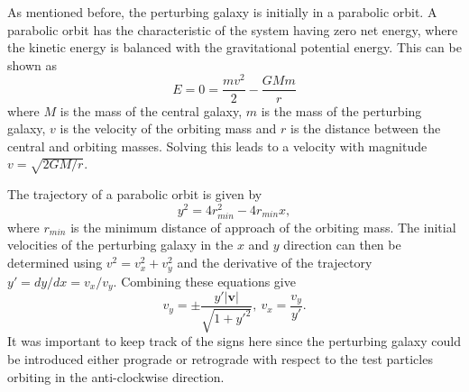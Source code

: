 \documentclass[twoside,twocolumn]{article}
\begin{document}
        As mentioned before, the perturbing galaxy is initially in a parabolic orbit. A parabolic orbit has the characteristic of the system having zero net energy, where the kinetic energy is balanced with the gravitational potential energy. This can be shown as
        \begin{equation}
            E = 0 = \frac{mv^2}{2} - \frac{GMm}{r}
        \end{equation}
        where $M$ is the mass of the central galaxy, $m$ is the mass of the perturbing galaxy, $v$ is the velocity of the orbiting mass and $r$ is the distance between the central and orbiting masses. Solving this leads to a velocity with magnitude $v = \sqrt{2GM/r}$. 
        
        The trajectory of a parabolic orbit is given by \cite{lecture}
        \begin{equation}
            y^2 = 4r_{min}^2 - 4r_{min}x,
        \end{equation}
        where $r_{min}$ is the minimum distance of approach of the orbiting mass. The initial velocities of the perturbing galaxy in the $x$ and $y$ direction can then be determined using $v^2 = v_x^2 + v_y^2$ and the derivative of the trajectory $y' = dy/dx = v_x/v_y$. Combining these equations give
        \begin{equation}
            v_y = \pm \frac{y'\lvert\bm{v}\lvert}{\sqrt{1 + y'^2}}, \ v_x = \frac{v_y}{y'}.
        \end{equation}
        It was important to keep track of the signs here since the perturbing galaxy could be introduced either prograde or retrograde with respect to the test particles orbiting in the anti-clockwise direction.
    
\end{document}

